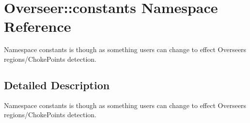 \hypertarget{namespaceOverseer_1_1constants}{}\section{Overseer\+:\+:constants Namespace Reference}
\label{namespaceOverseer_1_1constants}


Namespace constants is though as something users can change to effect Overseer\textquotesingle{}s regions/\+Choke\+Points detection.  




\subsection{Detailed Description}
Namespace constants is though as something users can change to effect Overseer\textquotesingle{}s regions/\+Choke\+Points detection. 